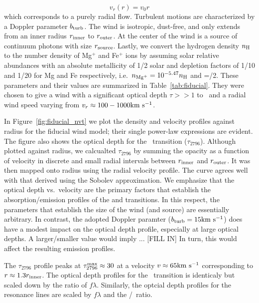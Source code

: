 \documentclass[12pt,preprint]{aastex}
\begin{document}
\begin{equation}
v_r (r) = v_0 r
\end{equation}
which corresponds to a purely radial flow.  Turbulent motions are
characterized by a Doppler parameter $b_{\rm turb}$.  
The wind is isotropic, dust-free, and only extends from an inner
radius $r_{\rm inner}$ to $r_{\rm outer}$.  At the center of the wind
is a source of continuum photons with size $r_{\rm source}$.  Lastly,
we convert the hydrogen density $n_{\rm H}$ to the number density of
Mg$^+$ and Fe$^+$ ions by assuming solar relative abundances with an
absolute metallicity of 1/2 solar and depletion factors of 1/10 and
1/20 for Mg and Fe respectively, i.e.\  $n_{\rm Mg^+} = 10^{-5.47} n_{\rm H}$ 
and \nfe=\nmg/2.   
These parameters and their values are summarized in
Table~\ref{tab:fiducial}.  
They were chosen to give a wind with a significant optical depth $\tau
>> 1$ to \mgiia\ and a radial wind speed varying from $v_r \approx 100
- 1000{\rm km~s^{-1}}$.  

In Figure~\ref{fig:fiducial_nvt} we plot the density and velocity
profiles against radius for the fiducial wind model;  
their single power-law expressions are evident.  The figure also
shows the optical depth for the \mgiia\ transition ($\tau_{2796}$).
Although plotted against radius, we calcualted $\tau_{2796}$ by
summing the opacity as a function of velocity in discrete and small radial intervals
between $r_{\rm inner}$  and $r_{\rm outer}$.   It was then mapped
onto radius using the radial velocity profile. 
The curve agrees well with that derived using the Sobolev approximation.
We emphasize that the optical depth vs.\ velocity are the primary
factors that establish the absorption/emission profiles of the
 and  transitions.  In this respect, the 
parameters that establish the size of the wind (and source) are
essentially arbitrary.   In contrast, the adopted Doppler paramter
($b_{\rm turb} = 15 {\rm km~s^{-1}}$) does have a modest impact on the optical
depth profile, especially at large optical depths.  A larger/smaller
value would imply ... [FILL IN]
In turn, this would affect the resulting emission profiles.

The $\tau_{2796}$ profile peaks at $\tau_{2796}^{\rm max} \approx 30$
at a velocity $v \approx 65 {\rm km~s^{-1}}$ corresponding to $r \approx 1.3
r_{\rm inner}$.  The optical depth profiles for the \mgiib\ transition
is identicaly but scaled down by the ratio of $f\lambda$.  Similarly,
the optcial depth profiles for the  resonance lines are
scaled by $f \lambda$ and the \nfe/\nmg\ ratio.  
\end{document}

